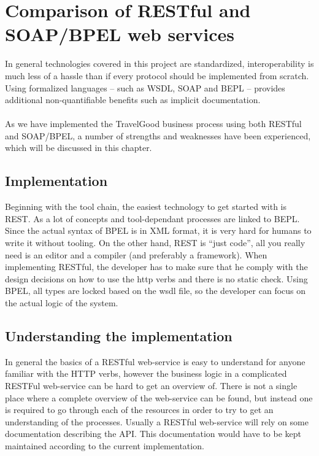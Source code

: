 {\setlength{\chapterfontsize}{26pt}
\chapter{Comparison of RESTful and SOAP/BPEL web services}
}
\kim

\noindent
In general technologies covered in this project are standardized, interoperability is much less of a hassle than if every protocol should be implemented from scratch. Using formalized languages -- such as WSDL, SOAP and BEPL -- provides additional non-quantifiable benefits such as implicit documentation.\\\\
As we have implemented the TravelGood business process using both RESTful and SOAP/BPEL, a number of strengths and weaknesses have been experienced, which will be discussed in this chapter.

\section{Implementation}
\mrb

\noindent
Beginning with the tool chain, the easiest technology to get started with is REST. As a lot of concepts and tool-dependant processes are linked to BEPL. Since the actual syntax of BPEL is in XML format, it is very hard for humans to write it without tooling. On the other hand, REST is ``just code'', all you really need is an editor and a compiler (and preferably a framework). When implementing RESTful, the developer has to make sure that he comply with the design decisions on how to use the http verbs and there is no static check. Using BPEL, all types are locked based on the wsdl file, so the developer can focus on the actual logic of the system. 

\section{Understanding the implementation}
\mkt

\noindent
In general the basics of a RESTful web-service is easy to understand for anyone familiar with the HTTP verbs, however the business logic in a complicated RESTFul web-service can be hard to get an overview of. There is not a single place where a complete overview of the web-service can be found, but instead one is required to go through each of the resources in order to try to get an understanding of the processes. Usually a RESTful web-service will rely on some documentation describing the API. This documentation would have to be kept maintained according to the current implementation. 

